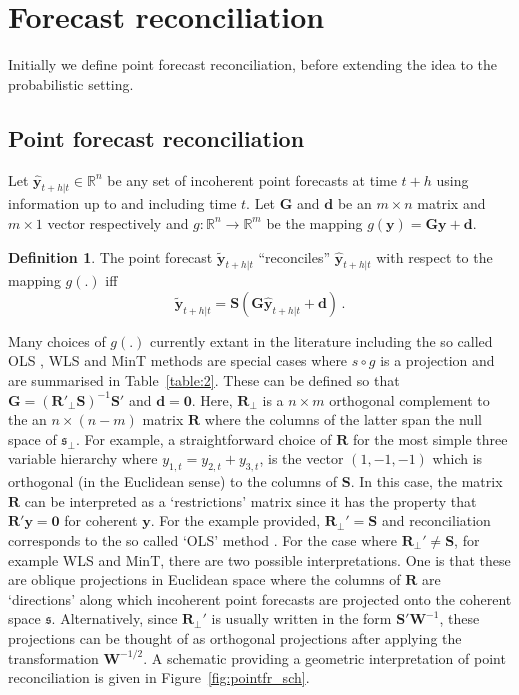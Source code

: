 \documentclass[a4paper, 11pt]{article}
\theoremstyle{theo}
\theoremstyle{definition}
\newtheorem{definition}{Definition}[section]
\begin{document}
\section{Forecast reconciliation}\label{sec:reconciliation}

Initially we define point forecast reconciliation, before extending the idea to the probabilistic setting.

\subsection{Point forecast reconciliation}


  Let $\hat{\bm{y}}_{t+h|t} \in \mathbb{R}^n$ be any set of incoherent point forecasts at time $t+h$ using information up to and including time $t$.  Let $\bm{G}$ and $\bm{d}$ be an $m\times n$ matrix and $m\times 1$ vector respectively and $g:\mathbb{R}^n \rightarrow \mathbb{R}^m$ be the mapping $g(\bm{y})={\bm G}{\bm y}+{\bm d}$.
  \begin{definition}\label{def:reconpoint}
  The point forecast $\tilde{\bm{y}}_{t+h|t}$ ``reconciles'' $\hat{\bm{y}}_{t+h|t}$ with respect to the mapping $g(.)$ iff
  \begin{equation}
    \tilde{\bm{y}}_{t+h|t}=\bm{S}\left(\bm{G}\hat{\bm{y}}_{t+h|t}+{\bm d}\right)\,.
  \end{equation} 
    
\end{definition}

Many choices of $g(.)$ currently extant in the literature including the so called OLS \cite{Hyndman2011}, WLS  and MinT\cite{Wickramasuriya2017} methods are special cases where $s\circ g$ is a projection and are summarised in Table~\ref{table:2}.  These can be defined so that ${\bm G}=\left({\bm R'_{\perp}}{\bm S}\right)^{-1}{\bm S}'$ and ${\bm d}={\bm 0}$.  Here, ${\bm R_{\perp}}$ is a $n\times m$ orthogonal complement to the an $n \times (n-m)$ matrix $\bm{R}$ where the columns of the latter span the null space of $\mathfrak{s}_{\perp}$.  For example, a straightforward choice of $\bm{R}$ for the most simple three variable hierarchy where $y_{1,t}=y_{2,t}+y_{3,t}$, is the vector $(1,-1,-1)$ which is orthogonal (in the Euclidean sense) to the columns of $\bm{S}$.  In this case, the matrix $\bm{R}$ can be interpreted as a `restrictions' matrix since it has the property that $\bm{R}'\bm{y}=\bm{0}$ for coherent $\bm{y}$.  For the example provided, ${\bm R}_\perp'={\bm S}$ and reconciliation corresponds to the so called `OLS' method \cite{Hyndman2011}.  For the case where ${\bm R}_\perp'\neq{\bm S}$, for example WLS and MinT, there are two possible interpretations.  One is that these are oblique projections in Euclidean space where the columns of $\bm{R}$ are `directions' along which incoherent point forecasts are projected onto the coherent space $\mathfrak{s}$.  Alternatively, since ${\bm R}_\perp'$ is usually written in the form ${\bm S}'{\bm W}^{-1}$, these projections can be thought of as orthogonal projections after applying the transformation ${\bm W^{-1/2}}$.  A schematic providing a geometric interpretation of point reconciliation is given in Figure~\ref{fig:pointfr_sch}. 
\end{document}
